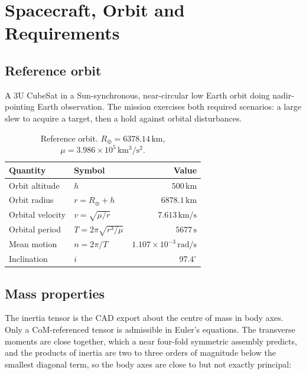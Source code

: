 \documentclass[conference,10pt,a4paper]{IEEEtran}
\newcommand{\unit}[1]{\ensuremath{\,\mathrm{#1}}}
\begin{document}
\section{Spacecraft, Orbit and Requirements}
\label{sec:mission}

\subsection{Reference orbit}

A 3U CubeSat in a Sun-synchronous, near-circular low Earth orbit doing
nadir-pointing Earth observation. The mission exercises both required
scenarios: a large slew to acquire a target, then a hold against orbital
disturbances.

\begin{table}[!t]
\centering
\caption{Reference orbit. $R_\oplus = 6378.14\unit{km}$,
$\mu = 3.986\times10^{5}\unit{km^3/s^2}$.}
\label{tab:orbit}
\footnotesize
\begin{tabular}{@{}llr@{}}
\toprule
\textbf{Quantity} & \textbf{Symbol} & \textbf{Value} \\
\midrule
Orbit altitude   & $h$                      & $500\unit{km}$ \\
Orbit radius     & $r = R_\oplus + h$       & $6878.1\unit{km}$ \\
Orbital velocity & $v = \sqrt{\mu/r}$       & $7.613\unit{km/s}$ \\
Orbital period   & $T = 2\pi\sqrt{r^3/\mu}$ & $5677\unit{s}$ \\
Mean motion      & $n = 2\pi/T$             & $1.107\times10^{-3}\unit{rad/s}$ \\
Inclination      & $i$                      & $97.4^\circ$ \\
\bottomrule
\end{tabular}
\end{table}

\subsection{Mass properties}

The inertia tensor is the CAD export about the centre of mass in body axes.
Only a CoM-referenced tensor is admissible in Euler's equations. The
transverse moments are close together, which a near four-fold symmetric
assembly predicts, and the products of inertia are two to three orders of
magnitude below the smallest diagonal term, so the body axes are close to but
not exactly principal:
\end{document}
